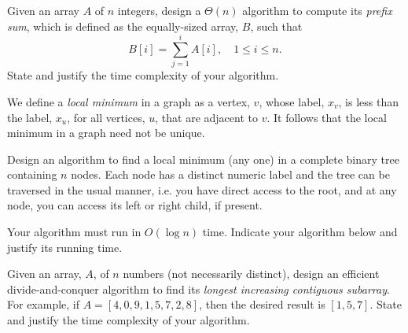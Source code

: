 \documentclass[addpoints]{exam}
\begin{document}
\begin{questions}
\begin{solution}
\begin{parts}
    \part 
    \end{parts}
  \end{solution}

    
\question[10] Given an array $A$ of $n$ integers, design a $\Theta(n)$ algorithm to compute its \textit{prefix sum}, which is defined as the equally-sized array, $B$, such that
  \[
    B[i] = \sum\limits_{j=1}^i A[i], \quad 1 \leq i \leq n.
  \]
  State and justify the time complexity of your algorithm.

  \begin{solution}
  \end{solution}

\question[10] We define a \textit{local minimum} in a graph as a vertex, $v$, whose label, $x_v$, is less than the label, $x_u$, for all vertices, $u$, that are adjacent to $v$. It follows that the local minimum in a graph need not be unique.

  Design an algorithm to find a local minimum (any one) in a complete binary tree containing $n$ nodes. Each node has a distinct numeric label and the tree can be traversed in the usual manner, i.e. you have direct access to the root, and at any node, you can access its left or right child, if present.

  Your algorithm must run in $O(\log n)$ time. Indicate your algorithm below and justify its running time.

  \begin{solution}
    
  \end{solution}


\question[10] Given an array, $A$, of $n$ numbers (not necessarily distinct), design an efficient divide-and-conquer algorithm to find its \textit{longest increasing contiguous subarray}. For example, if $A = [4, 0, 9, 1, 5, 7, 2, 8]$, then the desired result is $[1, 5, 7]$. State and justify the time complexity of your algorithm.

  \begin{solution}
    
  \end{solution}
  
\end{questions}
\end{document}
